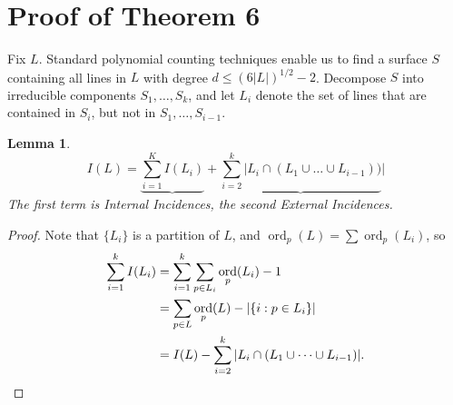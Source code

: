 \documentclass{article}
\theoremstyle{plain}
\newtheorem{lemma}[theorem]{Lemma}
\DeclareMathOperator{\RR}{\mathbf{R}}
\DeclareMathOperator{\ord}{\text{ord}}
\begin{document}

\section{Proof of Theorem 6}

Fix $L$. Standard polynomial counting techniques enable us to find a surface $S$ containing all lines in $L$ with degree $d \leq (6|L|)^{1/2} - 2$. Decompose $S$ into irreducible components $S_1, \dots, S_k$, and let $L_i$ denote the set of lines that are contained in $S_i$, but not in $S_1, \dots, S_{i-1}$.

\begin{lemma}
    \[ I(L) = \underbrace{\sum_{i = 1}^K I(L_i)} + \underbrace{\sum_{i = 2}^k |L_i \cap (L_1 \cup \dots \cup L_{i-1}))}| \]
    The first term is {\it Internal Incidences}, the second {\it External Incidences}.
\end{lemma}
\begin{proof}
    Note that $\{ L_i \}$ is a partition of $L$, and $\ord_p(L) = \sum \ord_p(L_i)$, so
    \begin{align*}
        \sum_{i = 1}^k I(L_i) &= \sum_{i = 1}^k \sum_{p \in L_i} \ord_p(L_i) - 1\\
        &= \sum_{p \in L} \ord_p(L) - |\{ i: p \in L_i \}|\\
        &= I(L) - \sum_{i = 2}^k |L_i \cap (L_1 \cup \dots \cup L_{i-1})|. \qedhere
    \end{align*}
\end{proof}
\end{document}
